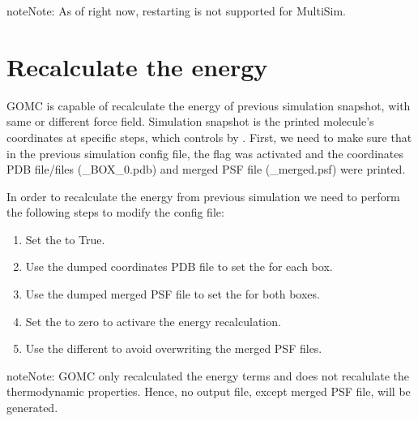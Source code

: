 \documentclass[letterpaper,10pt,english]{sphinxmanual}
\begin{document}
\begin{sphinxadmonition}{note}{Note:}
\sphinxAtStartPar
As of right now, restarting is not supported for Multi\sphinxhyphen{}Sim.
\end{sphinxadmonition}


\section{Recalculate the energy}
\label{\detokenize{howto:recalculate-the-energy}}
\sphinxAtStartPar
GOMC is capable of recalculate the energy of previous simulation snapshot, with same or different force field. Simulation snapshot is the printed molecule’s
coordinates at specific steps, which controls by . First, we need to make sure that in the previous simulation config file, the flag 
was activated and the coordinates PDB file/files (\_BOX\_0.pdb) and merged PSF file (\_merged.psf) were printed.

\sphinxAtStartPar
In order to recalculate the energy from previous simulation we need to perform the following steps to modify the config file:
\begin{enumerate}
%
\item {} 
\sphinxAtStartPar
Set the  to True.

\item {} 
\sphinxAtStartPar
Use the dumped coordinates PDB file to set the  for each box.

\item {} 
\sphinxAtStartPar
Use the dumped merged PSF file to set the  for both boxes.

\item {} 
\sphinxAtStartPar
Set the  to zero to activare the energy recalculation.

\item {} 
\sphinxAtStartPar
Use the different  to avoid overwriting the merged PSF files.

\end{enumerate}

\begin{sphinxadmonition}{note}{Note:}
\sphinxAtStartPar
GOMC only recalculated the energy terms and does not recalulate the thermodynamic properties. Hence, no output file, except merged PSF file, will be
generated.
\end{sphinxadmonition}
\end{document}
